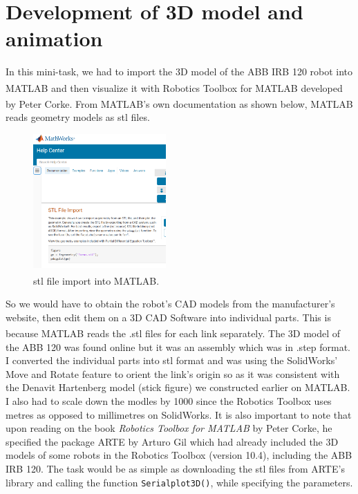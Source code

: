 \section{Development of 3D model and animation}
In this mini-task, we had to import the 3D model of the ABB IRB 120 robot into MATLAB\textsuperscript{\textregistered} and then visualize it with Robotics Toolbox for MATLAB\textsuperscript{\textregistered} developed by Peter Corke. From MATLAB's own documentation as shown below, MATLAB\textsuperscript{\textregistered}  reads geometry models as stl files.

\begin{figure}[H]
  \centering
  \includegraphics[width=2.0in ]{pics/stl.png}
  \caption{stl file import into MATLAB\textsuperscript{\textregistered}.}
  \label{stl}
\end{figure}



So we would have to obtain the robot's CAD models from the manufacturer's website, then edit them on a 3D CAD Software into individual parts. This is because MATLAB\textsuperscript{\textregistered} reads the .stl files for each link separately. The 3D model of the ABB 120 was found online but it was an assembly which was in .step format. I converted the individual parts into stl format and was using the SolidWorks' Move and Rotate feature to orient the link's origin so as it was consistent with the Denavit Hartenberg model (stick figure) we constructed earlier on MATLAB. I also had to scale down the modles by 1000 since the Robotics Toolbox uses metres as opposed to millimetres on SolidWorks. It is also important to note that upon reading on the book \textit{Robotics Toolbox for MATLAB} by Peter Corke, he specified the package ARTE by Arturo Gil \cite{ARTEARob24:online} which had already included the 3D models of some robots in the Robotics Toolbox (version 10.4), including the ABB IRB 120. The task would be as simple as downloading the stl files from ARTE's library \cite{ARTEARob24:online} and calling the function \texttt{Serialplot3D()}, while specifying the parameters.


